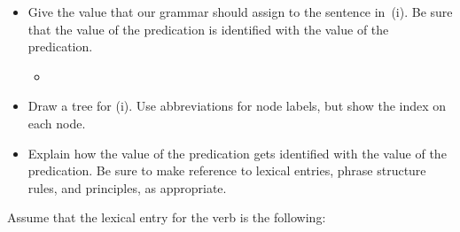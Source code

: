 \documentclass[a4paper,landscape,headrule,footrule]{foils}
\begin{document}
\begin{itemize}
\item[A.] Give the  value that our grammar should assign to
the sentence in~(i).  Be sure that the  value of the 
predication
is identified with the  value of the 
predication.

\begin{itemize}
\item[(i)] 
\end{itemize}


\item[B.] Draw a tree for (i).  Use abbreviations for node labels, but
  show the index on each node.

\item[C.] Explain how the  value of the  
predication
gets identified with the  value of the  
predication.
Be sure to make reference to lexical entries, phrase structure rules,
and principles, as appropriate.

\end{itemize}





Assume that the lexical entry for the verb  is the
following: 

\begin{exe}
\ex\label{s:exi} {}
\end{exe}
\end{document}
